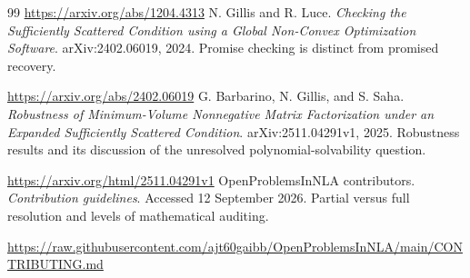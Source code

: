 \documentclass[11pt]{article}
\theoremstyle{definition}\newtheorem{definition}[theorem]{Definition}
\begin{document}
\begin{thebibliography}{99}
\url{https://arxiv.org/abs/1204.4313}
 N. Gillis and R. Luce. \emph{Checking the Sufficiently Scattered Condition using a Global Non-Convex Optimization Software}. arXiv:2402.06019, 2024. Promise checking is distinct from promised recovery.\par
\url{https://arxiv.org/abs/2402.06019}
 G. Barbarino, N. Gillis, and S. Saha. \emph{Robustness of Minimum-Volume Nonnegative Matrix Factorization under an Expanded Sufficiently Scattered Condition}. arXiv:2511.04291v1, 2025. Robustness results and its discussion of the unresolved polynomial-solvability question.\par
\url{https://arxiv.org/html/2511.04291v1}
 OpenProblemsInNLA contributors. \emph{Contribution guidelines}. Accessed 12 September 2026. Partial versus full resolution and levels of mathematical auditing.\par
\url{https://raw.githubusercontent.com/ajt60gaibb/OpenProblemsInNLA/main/CONTRIBUTING.md}
\end{thebibliography}
\end{document}

